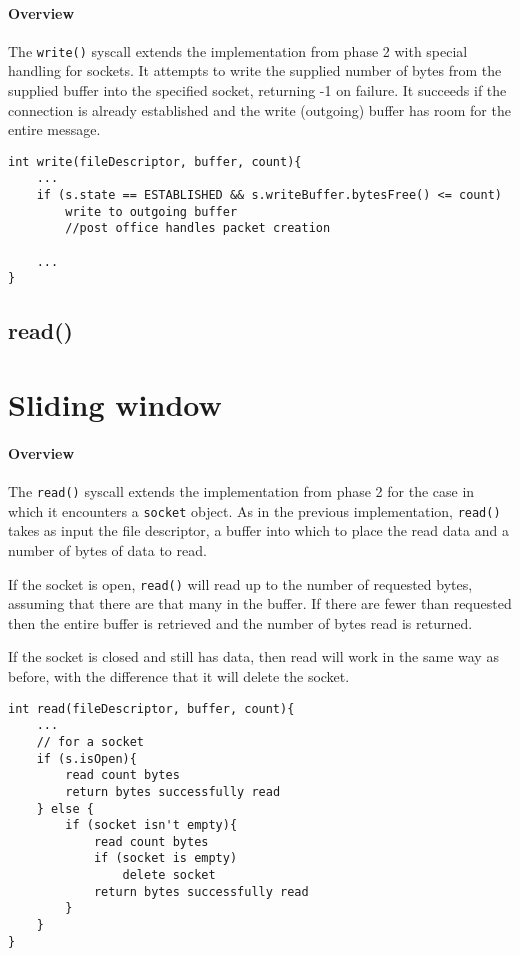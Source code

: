 \documentclass[]{article}
\begin{document}
\paragraph{Overview}
The \texttt{write()} syscall extends the implementation from phase 2 with special handling for sockets. It attempts to write the supplied number of bytes from the supplied buffer into the specified socket, returning -1 on failure. It succeeds if the connection is already established and the write (outgoing) buffer has room for the entire message.
\begin{lstlisting}
int write(fileDescriptor, buffer, count){
	...
	if (s.state == ESTABLISHED && s.writeBuffer.bytesFree() <= count)
		write to outgoing buffer
		//post office handles packet creation
		
	...
}
\end{lstlisting}

\subsection{read()}

\section{Sliding window}

\paragraph{Overview}
The \texttt{read()} syscall extends the implementation from phase 2 for the case in which it encounters a \texttt{socket} object. As in the previous implementation, \texttt{read()} takes as input the file descriptor, a buffer into which to place the read data and a number of bytes of data to read.

If the socket is open, \texttt{read()} will read up to the number of requested bytes, assuming that there are that many in the buffer. If there are fewer than requested then the entire buffer is retrieved and the number of bytes read is returned.

If the socket is closed and still has data, then read will work in the same way as before, with the difference that it will delete the socket. 

\begin{lstlisting}
int read(fileDescriptor, buffer, count){
	...
	// for a socket
	if (s.isOpen){
		read count bytes
		return bytes successfully read
	} else {
		if (socket isn't empty){
			read count bytes
			if (socket is empty)
				delete socket
			return bytes successfully read	
		}	
	}
}


\end{lstlisting}
\end{document}
